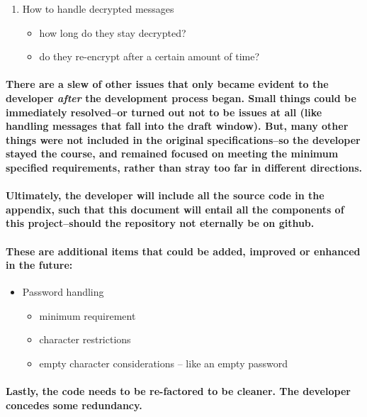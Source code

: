 \begin{enumerate}
\item How to handle decrypted messages
\begin{itemize}
\item how long do they stay decrypted?
\item do they re-encrypt after a certain amount of time?
\end{itemize}
\end{enumerate}

\paragraph{There are a slew of other issues that only became evident to the developer \emph{after} the development process began. Small things could be immediately resolved--or turned out not to be issues at all (like handling messages that fall into the draft window). But, many other things were not included in the original specifications--so the developer stayed the course, and remained focused on meeting the minimum specified requirements, rather than stray too far in different directions.}


\paragraph{Ultimately, the developer will include all the source code in the appendix, such that this document will entail all the components of this project--should the repository not eternally be on github.}

\paragraph{These are additional items that could be added, improved or enhanced in the future:}

\begin{itemize}
\item Password handling
\begin{itemize}
\item minimum requirement
\item character restrictions
\item empty character considerations -- like an empty password
\end{itemize}
\end{itemize}

\paragraph{Lastly, the code needs to be re-factored to be cleaner. The developer concedes some redundancy.}